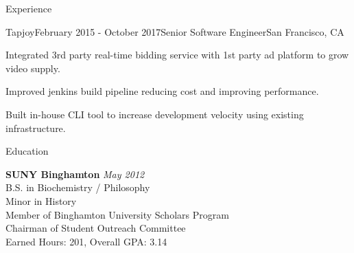 \documentclass[
	11pt, %
]{resume} %
\begin{document}
\begin{rSection}{Experience}

	\begin{rSubsection}{Tapjoy}{February 2015 - October 2017}{Senior Software Engineer}{San Francisco, CA}
		\item Integrated 3rd party real-time bidding service with 1st party ad platform to grow video supply.
		\item Improved jenkins build pipeline reducing cost and improving performance.
		\item Built in-house CLI tool to increase development velocity using existing infrastructure.
	\end{rSubsection}

\end{rSection}


\begin{rSection}{Education}
	
	\textbf{SUNY Binghamton} \hfill \textit{May 2012} \\ 
	B.S. in Biochemistry / Philosophy \\
	Minor in History \smallskip \\
	Member of Binghamton University Scholars Program \\
    Chairman of Student Outreach Committee \smallskip \\
	Earned Hours: 201, Overall GPA: 3.14
	
\end{rSection}





\end{document}
